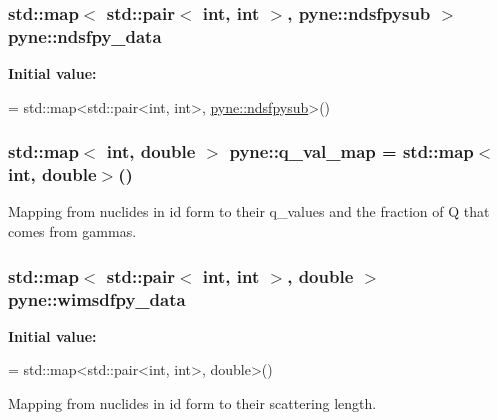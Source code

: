 \subsubsection[{\texorpdfstring{ndsfpy\+\_\+data}{ndsfpy_data}}]{\setlength{\rightskip}{0pt plus 5cm}std\+::map$<$ std\+::pair$<$ int, int $>$, {\bf pyne\+::ndsfpysub} $>$ pyne\+::ndsfpy\+\_\+data}\hypertarget{namespacepyne_a0526a4bf1637612d760c106836475c6d}{}\label{namespacepyne_a0526a4bf1637612d760c106836475c6d}
{\bfseries Initial value\+:}
\begin{DoxyCode}
= 
  std::map<std::pair<int, int>, \hyperlink{structpyne_1_1ndsfpysub}{pyne::ndsfpysub}>()
\end{DoxyCode}
\subsubsection[{\texorpdfstring{q\+\_\+val\+\_\+map}{q_val_map}}]{\setlength{\rightskip}{0pt plus 5cm}std\+::map$<$ int, double $>$ pyne\+::q\+\_\+val\+\_\+map = std\+::map$<$int, double$>$()}\hypertarget{namespacepyne_af7b850fa105454bc35f4167d41071239}{}\label{namespacepyne_af7b850fa105454bc35f4167d41071239}
Mapping from nuclides in id form to their q\+\_\+values and the fraction of Q that comes from gammas. 
\subsubsection[{\texorpdfstring{wimsdfpy\+\_\+data}{wimsdfpy_data}}]{\setlength{\rightskip}{0pt plus 5cm}std\+::map$<$ std\+::pair$<$ int, int $>$, double $>$ pyne\+::wimsdfpy\+\_\+data}\hypertarget{namespacepyne_a2512ebcde5e39e49cd6ed25bb09ff374}{}\label{namespacepyne_a2512ebcde5e39e49cd6ed25bb09ff374}
{\bfseries Initial value\+:}
\begin{DoxyCode}
= 
  std::map<std::pair<int, int>, \textcolor{keywordtype}{double}>()
\end{DoxyCode}


Mapping from nuclides in id form to their scattering length. 

